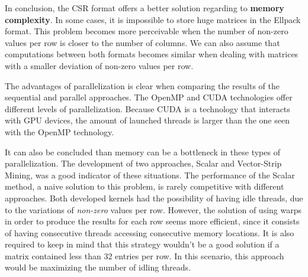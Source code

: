 \documentclass[12pt]{article}
\begin{document}
\par In conclusion, the CSR format offers a better solution regarding to \textbf{memory complexity}. In some cases, it is impossible to store huge matrices in the Ellpack format. This problem becomes more perceivable when the number of non-zero values per row is closer to the number of columns. We can also assume that computations between both formats becomes similar when dealing with matrices with a smaller deviation of non-zero values per row.
\par The advantages of parallelization is clear when comparing the results of the sequential and parallel approaches. The OpenMP and CUDA technologies offer different levels of parallelization. Because CUDA is a technology that interacts with GPU devices, the amount of launched threads is larger than the one seen with the OpenMP technology.
\par It can also be concluded than memory can be a bottleneck in these types of parallelization. The development of two approaches, Scalar and Vector-Strip Mining, was a good indicator of these situations. The performance of the Scalar method, a naive solution to this problem, is rarely competitive with different approaches. Both developed kernels had the possibility of having idle threads, due to the variations of \textit{non-zero} values per row. However, the solution of using warps in order to produce the results for each row seems more efficient, since it consists of having consecutive threads accessing consecutive memory locations. It is also required to keep in mind that this strategy wouldn't be a good solution if a matrix contained less than 32 entries per row. In this scenario, this approach would be maximizing the number of idling threads.
 
\end{document}
